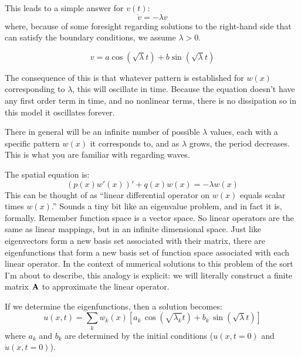 This leads to a simple answer for $v(t)$:
\begin{equation}
\ddot{v} = - \lambda v
\end{equation}
where, because of some foresight regarding solutions to the right-hand
side that can satisfy the boundary conditions, we assume $\lambda>0$.


\begin{answer}
\begin{equation}
v = a \cos(\sqrt{\lambda} t) + b \sin(\sqrt{\lambda} t)
\end{equation}

The consequence of this is that whatever pattern is established for
$w(x)$ corresponding to $\lambda$, this will oscillate in
time. Because the equation doesn't have any first order term in time,
and no nonlinear terms, there is no dissipation so in this model it
oscillates forever.

There in general will be an infinite number of possible $\lambda$
values, each with a specific pattern $w(x)$ it corresponds to, and as
$\lambda$ grows, the period decreases. This is what you are familiar
with regarding waves.
\end{answer}

The spatial equation is:
\begin{equation}
\left(p(x) w'(x)\right)' + q(x) w(x) = -\lambda w(x)
\end{equation}
This can be thought of as ``linear differential operator on $w(x)$
equals scalar times $w(x)$.'' Sounds a tiny bit like an eigenvalue
problem, and in fact it is, formally. Remember function space is a
vector space. So linear operators are the same as linear mappings, but
in an infinite dimensional space. Just like eigenvectors form a new
basis set associated with their matrix, there are eigenfunctions  that
form a new basis set of function space associated with each linear
operator. In the context of numerical solutions to this problem of the
sort I'm about to describe, this analogy is explicit: we will
literally construct a finite matrix ${\bf A}$ to approximate the
linear operator.

If we determine the eigenfunctions, then a solution becomes:
\begin{equation}
u(x,t) = \sum_{k} w_k(x) \left[ a_k\, \cos(\sqrt{\lambda_k} t) + b_k\,
  \sin(\sqrt{\lambda} t) \right]
\end{equation}
where $a_k$ and $b_k$ are determined by the initial conditions
($u(x, t=0)$ and $\dot{u}(x, t=0)$).

